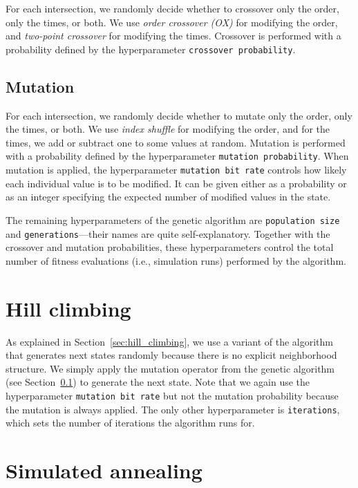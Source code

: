 For each intersection, we randomly decide whether to crossover only the order, only the times, or both. We use \textit{order crossover (OX)} for modifying the order, and \textit{two-point crossover} for modifying the times. Crossover is performed with a probability defined by the hyperparameter \texttt{crossover probability}.

\subsection{Mutation} \label{sec:mutation_application}

For each intersection, we randomly decide whether to mutate only the order, only the times, or both. We use \textit{index shuffle} for modifying the order, and for the times, we add or subtract one to some values at random. Mutation is performed with a probability defined by the hyperparameter \texttt{mutation probability}. When mutation is applied, the hyperparameter \texttt{mutation bit rate} controls how likely each individual value is to be modified. It can be given either as a probability or as an integer specifying the expected number of modified values in the state.

\bigskip

The remaining hyperparameters of the genetic algorithm are \texttt{population size} and \texttt{generations}---their names are quite self-explanatory. Together with the crossover and mutation probabilities, these hyperparameters control the total number of fitness evaluations (i.e., simulation runs) performed by the algorithm.

\section{Hill climbing} \label{sec:hill_climbing_application}

As explained in Section~\ref{sec:hill_climbing}, we use a variant of the algorithm that generates next states randomly because there is no explicit neighborhood structure. We simply apply the mutation operator from the genetic algorithm (see Section~\ref{sec:mutation_application}) to generate the next state. Note that we again use the hyperparameter \texttt{mutation bit rate} but not the mutation probability because the mutation is always applied. The only other hyperparameter is \texttt{iterations}, which sets the number of iterations the algorithm runs for.

\section{Simulated annealing} \label{sec:simulated_annealing_application}

